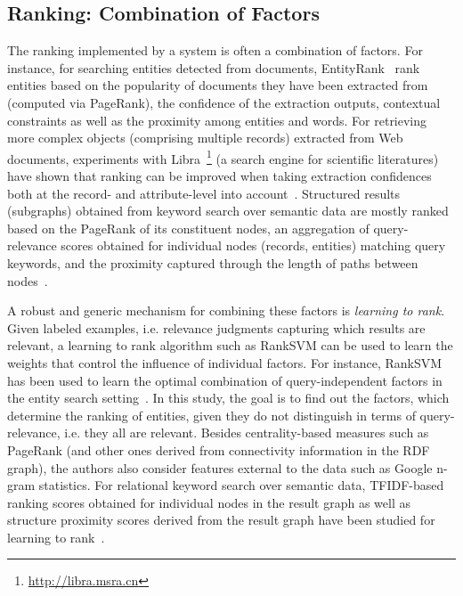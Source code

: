 \subsection{Ranking: Combination of Factors}
The ranking implemented by a system is often a combination of factors. For instance, for searching entities detected from documents, EntityRank~\cite{DBLP:conf/vldb/ChengYC07} rank entities based on the popularity of documents they have been extracted from (computed via PageRank), the confidence of the extraction outputs, contextual constraints as well as the proximity among entities and words. For retrieving more complex objects (comprising multiple records) extracted from Web documents, experiments with Libra~\footnote{\url{http://libra.msra.cn}} (a search engine for scientific literatures) have shown that ranking can be improved when taking extraction confidences both at the record- and attribute-level into account~\cite{DBLP:conf/www/NieMSWM07}. Structured results (subgraphs) obtained from keyword search over semantic data are mostly ranked based on the PageRank of its constituent nodes, an aggregation of query-relevance scores obtained for individual nodes (records, entities) matching query keywords, and the proximity captured through the length of paths between nodes~\cite{DBLP:conf/icde/TranWRC09}. 

A robust and generic mechanism for combining these factors is \emph{learning to rank}. Given labeled examples, i.e. relevance judgments capturing which results are relevant, a learning to rank algorithm such as RankSVM can be used to learn the weights that control the influence of individual factors. For instance, RankSVM has been used to learn the optimal combination of query-independent factors in the entity search setting~\cite{DBLP:conf/eswc/Tran12}. In this study, the goal is to find out the factors, which determine the ranking of entities, given they do not distinguish in terms of query-relevance, i.e. they all are relevant. Besides centrality-based measures such as PageRank (and other ones derived from connectivity information in the RDF graph), the authors also consider features external to the data such as Google n-gram statistics. For relational keyword search over semantic data, TFIDF-based ranking scores obtained for individual nodes in the result graph as well as structure proximity scores derived from the result graph have been studied for learning to rank~\cite{DBLP:conf/cikm/CoffmanW11}. 



